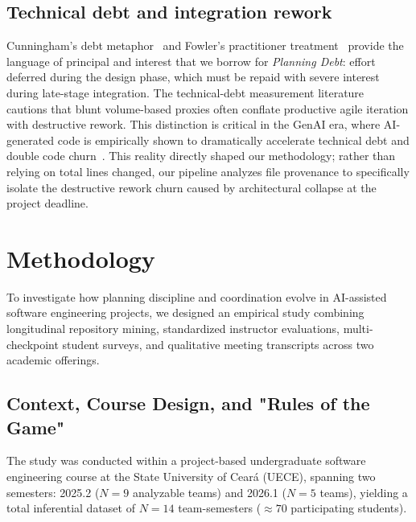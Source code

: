 \documentclass[conference]{IEEEtran}
\begin{document}
\subsection{Technical debt and integration rework}
Cunningham's debt metaphor~\cite{cunningham_1992_technical_debt} and Fowler's practitioner 
treatment~\cite{fowler2009technicaldebt} provide the language of principal and 
interest that we borrow for \emph{Planning Debt}: effort deferred during the design 
phase, which must be repaid with severe interest during late-stage integration. 
The technical-debt measurement literature~\cite{kruchten2012technicaldebt} cautions 
that blunt volume-based proxies often conflate productive agile iteration with 
destructive rework. This distinction is critical in the GenAI era, where AI-generated 
code is empirically shown to dramatically accelerate technical debt and double code 
churn~\cite{codebridge2026hidden}. This reality directly shaped our methodology; 
rather than relying on total lines changed, our pipeline analyzes file provenance 
to specifically isolate the destructive rework churn caused by architectural collapse 
at the project deadline.

\section{Methodology}
\label{sec:method}

To investigate how planning discipline and coordination evolve in AI-assisted software engineering projects, we designed an empirical study combining longitudinal repository mining, standardized instructor evaluations, multi-checkpoint student surveys, and qualitative meeting transcripts across two academic offerings.

\subsection{Context, Course Design, and "Rules of the Game"}
The study was conducted within a project-based undergraduate software engineering course at the State University of Ceará (UECE), spanning two semesters: 2025.2 ($N = 9$ analyzable teams) and 2026.1 ($N = 5$ teams), yielding a total inferential dataset of $N = 14$ team-semesters ($\approx 70$ participating students). 
\end{document}
